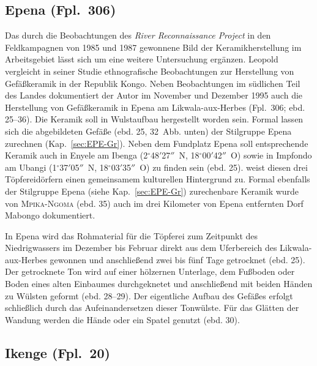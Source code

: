 \subsection*{Epena (Fpl.~306)}\label{sec:EPE_Herstellung}

Das durch die Beobachtungen des \textit{River Reconnaissance Project} in den Feldkampagnen von 1985 und 1987 gewonnene Bild der Keramikherstellung im Arbeitsgebiet lässt sich um eine weitere Untersuchung ergänzen. Leopold \textcite{MpikaNgoma.1996} vergleicht in seiner Studie ethnografische Beobachtungen zur Herstellung von Gefäßkeramik in der Republik Kongo. Neben Beobachtungen im südlichen Teil des Landes dokumentiert der Autor im November und Dezember 1995 auch die Herstellung von Gefäßkeramik in Epena am Likwala-aux-Herbes (Fpl.~306; ebd. 25--36). Die Keramik soll in Wulstaufbau hergestellt worden sein. Formal lassen sich die abgebildeten Gefäße (ebd. 25, 32~Abb. unten) der Stilgruppe Epena zurechnen (Kap.~\ref{sec:EPE-Gr}). Neben dem Fundplatz Epena soll entsprechende Keramik auch in Enyele am Ibenga (2$^\circ$48$'$27$''$~N, 18$^\circ$00$'$42$''$~O) sowie in Impfondo am Ubangi (1$^\circ$37$'$05$''$~N, 18$^\circ$03$'$35$''$~O) zu finden sein (ebd. 25). \textcite{MpikaNgoma.1996} weist diesen drei Töpfereidörfern einen gemeinsamem kulturellen Hintergrund zu. Formal ebenfalls der Stilgruppe Epena (siehe Kap.~\ref{sec:EPE-Gr}) zurechenbare Keramik wurde von \textsc{Mpika-Ngoma} (ebd. 35) auch im  drei Kilometer von Epena entfernten Dorf Mabongo dokumentiert. 

In Epena wird das Rohmaterial für die Töpferei zum Zeitpunkt des Niedrigwassers im Dezember bis Februar direkt aus dem Uferbereich des Likwala-aux-Herbes gewonnen und anschließend zwei bis fünf Tage getrocknet (ebd. 25). Der getrocknete Ton wird auf einer hölzernen Unterlage, dem Fußboden oder Boden eines alten Einbaumes durchgeknetet und anschließend mit beiden Händen zu Wülsten geformt (ebd. 28--29). Der eigentliche Aufbau des Gefäßes erfolgt schließlich durch das Aufeinandersetzen dieser Tonwülste. Für das Glätten der Wandung werden die Hände oder ein Spatel genutzt (ebd. 30).


\subsection*{Ikenge (Fpl.~20)}


